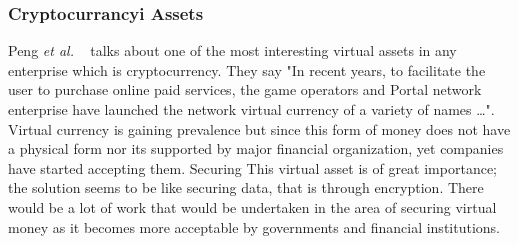 \subsubsection{Cryptocurrancyi Assets} \label{sec:crypto_cur}
Peng \textit{et al.} ~\cite{4908498} talks about one of the most interesting virtual assets in any enterprise which is cryptocurrency. They say "In recent years, to facilitate the user to purchase online paid services, the game operators and Portal network enterprise have launched the network virtual currency of a variety of names \ldots". Virtual currency is gaining prevalence but since this form of money does not have a physical form nor its supported by major financial organization, yet companies have started accepting them. Securing This virtual asset is of great importance; the solution seems to be like securing data, that is through encryption. There would be a lot of work that would be undertaken in the area of securing virtual money as it becomes more acceptable by governments and financial institutions.\\

